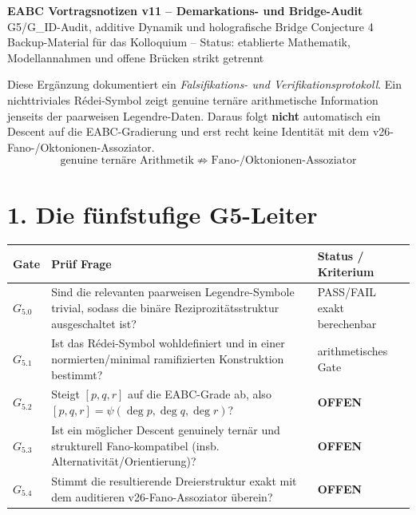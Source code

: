 \documentclass[11pt,a4paper]{article}
\begin{document}
\begin{center}
{\Large\bfseries EABC Vortragsnotizen v11 -- Demarkations- und Bridge-Audit}\\[1mm]
{\large G5/G\_ID-Audit, additive Dynamik und holografische Bridge Conjecture 4}\\[1mm]
{\small Backup-Material für das Kolloquium -- Status: etablierte Mathematik, Modellannahmen und offene Brücken strikt getrennt}
\end{center}

\begin{warningbox}
Diese Ergänzung dokumentiert ein \emph{Falsifikations- und Verifikationsprotokoll}. Ein nichttriviales Rédei-Symbol zeigt genuine ternäre arithmetische Information jenseits der paarweisen Legendre-Daten. Daraus folgt \textbf{nicht} automatisch ein Descent auf die EABC-Gradierung und erst recht keine Identität mit dem v26-Fano-/Oktonionen-Assoziator.
\[
\boxed{\text{genuine ternäre Arithmetik}\;\not\Rightarrow\;\text{Fano-/Oktonionen-Assoziator}}
\]
\end{warningbox}

\section*{1. Die fünfstufige G5-Leiter}

\begin{center}
\renewcommand{\arraystretch}{1.25}
\begin{tabularx}{\textwidth}{>{\bfseries}p{1.5cm} X p{3.2cm}}
\toprule
Gate & Prüf Frage & Status / Kriterium\\
\midrule
$G_{5.0}$ & Sind die relevanten paarweisen Legendre-Symbole trivial, sodass die binäre Reziprozitätsstruktur ausgeschaltet ist? & PASS/FAIL exakt berechenbar\\
$G_{5.1}$ & Ist das Rédei-Symbol wohldefiniert und in einer normierten/minimal ramifizierten Konstruktion bestimmt? & arithmetisches Gate\\
$G_{5.2}$ & Steigt $[p,q,r]$ auf die EABC-Grade ab, also $[p,q,r]=\psi(\deg p,\deg q,\deg r)$? & \textbf{OFFEN}\\
$G_{5.3}$ & Ist ein möglicher Descent genuinely ternär und strukturell Fano-kompatibel (insb. Alternativität/Orientierung)? & \textbf{OFFEN}\\
$G_{5.4}$ & Stimmt die resultierende Dreierstruktur exakt mit dem auditieren v26-Fano-Assoziator überein? & \textbf{OFFEN}\\
\bottomrule
\end{tabularx}
\end{center}
\end{document}
